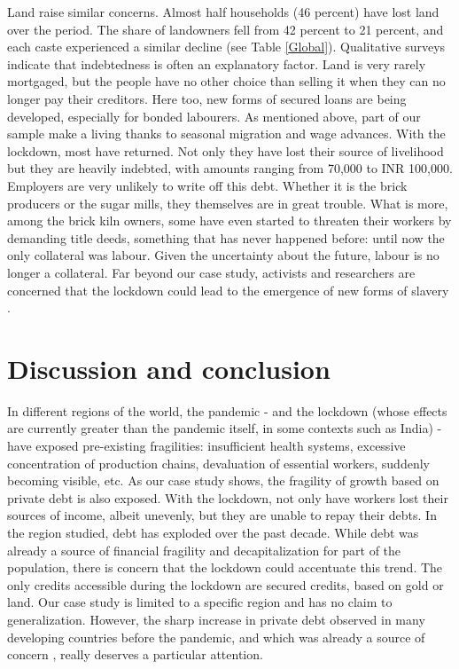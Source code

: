 \documentclass[a4paper, 11pt, onecolumn]{article}
\begin{document}
Land raise similar concerns. Almost half households (46 percent) have lost land over the period. The share of landowners fell from 42 percent to 21 percent, and each caste experienced a similar decline (see Table \ref{Global}). Qualitative surveys indicate that indebtedness is often an explanatory factor. Land is very rarely mortgaged, but the people have no other choice than selling it when they can no longer pay their creditors.  Here too, new forms of secured loans are being developed, especially for bonded labourers. As mentioned above, part of our sample make a living thanks to seasonal migration and wage advances. With the lockdown, most have returned. Not only they have lost their source of livelihood but they are heavily indebted, with amounts ranging from 70,000 to INR 100,000. Employers are very unlikely to write off this debt. Whether it is the brick producers or the sugar mills, they themselves are in great trouble. What is more, among the brick kiln owners, some have even started to threaten their workers by demanding title deeds, something that has never happened before: until now the only collateral was labour. Given the uncertainty about the future, labour is no longer a collateral. Far beyond our case study, activists and researchers are concerned that the lockdown could lead to the emergence of new forms of slavery \citep[p.14]{Sahas2020, Nagaraj2020}.   

\section*{Discussion and conclusion}
\label{section:conclusion}
In different regions of the world, the pandemic - and the lockdown (whose effects are currently greater than the pandemic itself, in some contexts such as India) - have exposed pre-existing fragilities: insufficient health systems, excessive concentration of production chains, devaluation of essential workers, suddenly becoming visible, etc. As our case study shows, the fragility of growth based on private debt is also exposed. With the lockdown, not only have workers lost their sources of income, albeit unevenly, but they are unable to repay their debts. In the region studied, debt has exploded over the past decade. While debt was already a source of financial fragility and decapitalization for part of the population, there is concern that the lockdown could accentuate this trend. The only credits accessible during the lockdown are secured credits, based on gold or land.
Our case study is limited to a specific region and has no claim to generalization. However, the sharp increase in private debt observed in many developing countries before the pandemic, and which was already a source of concern \citep{WorldBank2020, UNCTAD2019, UN2020}, really deserves a particular attention.
\end{document}
